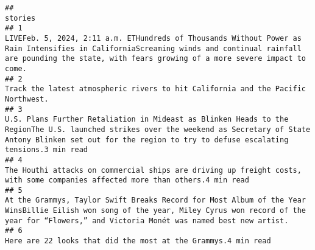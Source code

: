 \documentclass[
]{article}
\begin{document}
\begin{verbatim}
##                                                                                                                                                                                                                                                                                                                                                                                                                  stories
## 1                                                                                                                                                                                                 LIVEFeb. 5, 2024, 2:11 a.m. ETHundreds of Thousands Without Power as Rain Intensifies in CaliforniaScreaming winds and continual rainfall are pounding the state, with fears growing of a more severe impact to come. 
## 2                                                                                                                                                                                                                                                                                                                                       Track the latest atmospheric rivers to hit California and the Pacific Northwest.
## 3                                                                                                                                                                                         U.S. Plans Further Retaliation in Mideast as Blinken Heads to the RegionThe U.S. launched strikes over the weekend as Secretary of State Antony Blinken set out for the region to try to defuse escalating tensions.3 min read
## 4                                                                                                                                                                                                                                                                                          The Houthi attacks on commercial ships are driving up freight costs, with some companies affected more than others.4 min read
## 5                                                                                                                                                                                                         At the Grammys, Taylor Swift Breaks Record for Most Album of the Year WinsBillie Eilish won song of the year, Miley Cyrus won record of the year for “Flowers,” and Victoria Monét was named best new artist. 
## 6                                                                                                                                                                                                                                                                                                                                                          Here are 22 looks that did the most at the Grammys.4 min read

\end{verbatim}
\end{document}
